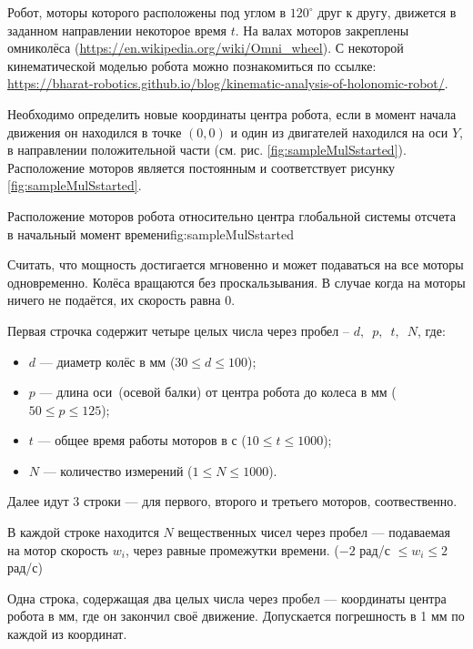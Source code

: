 
Робот, моторы которого расположены под углом в $120^{\circ}$ друг к другу,
движется в заданном направлении некоторое время $t$.
На валах моторов закреплены омниколёса (\url{https://en.wikipedia.org/wiki/Omni_wheel}).
С некоторой кинематической моделью робота можно познакомиться по ссылке:
\url{https://bharat-robotics.github.io/blog/kinematic-analysis-of-holonomic-robot/}.


Необходимо определить новые координаты центра робота,  если в момент начала движения он находился в точке
$(0,0)$ и один из двигателей находился на оси $Y$, в направлении положительной части (см. рис. \ref{fig:sampleMulSstarted}).
Расположение моторов является постоянным и соответствует рисунку \ref{fig:sampleMulSstarted}.

{Расположение моторов робота относительно центра глобальной системы отсчета в начальный момент времени}{fig:sampleMulSstarted}

Считать, что мощность достигается мгновенно и может подаваться на все моторы одновременно.
Колёса вращаются без проскальзывания.
В случае когда на моторы ничего не подаётся, их скорость равна $0$.


Первая строчка содержит четыре целых числа через пробел -- $d,$~$p,$~$t,$~$N$, где:

\begin{itemize}
    \item $d$ --- диаметр колёс в мм ($30 \leq d \leq 100$);
    \item $p$ --- длина оси~(осевой балки) от центра робота до колеса в мм ($ 50 \leq p \leq 125$);
    \item $t$ --- общее время работы моторов в с ($10 \leq t \leq 1000$);
    \item $N$ --- количество измерений ($1 \leq N \leq 1000$).
\end{itemize}


Далее идут $3$ строки --- для первого, второго и третьего моторов, соотвественно.

В каждой строке находится $N$ вещественных чисел через пробел ---  подаваемая на мотор скорость $w_i$, через равные промежутки
времени. ($-2$ рад/с $\leq w_i \leq 2$ рад/с)


\outputfmtSection

Одна строка, содержащая два целых числа  через пробел  --- координаты центра робота в мм,
где он закончил своё движение.
Допускается погрешность в 1 мм по каждой из координат.


